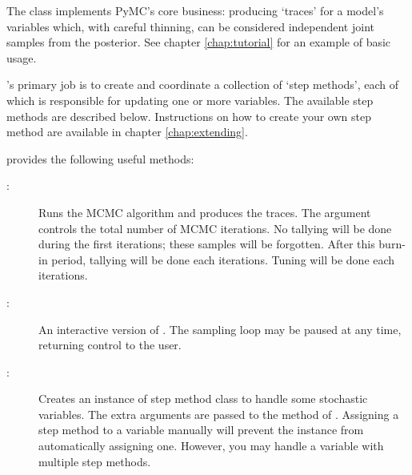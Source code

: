 The  class implements PyMC's core business: producing `traces' for a model's variables which, with careful thinning, can be considered independent joint samples from the posterior. See chapter \ref{chap:tutorial} for an example of basic usage.

's primary job is to create and coordinate a collection of `step methods', each of which is responsible for updating one or more variables. The available step methods are described below. Instructions on how to create your own step method are available in chapter \ref{chap:extending}.  

 provides the following useful methods:  
\begin{description}
    \item[:] Runs the MCMC algorithm and produces the traces. The  argument controls the total number of MCMC iterations. No tallying will be done during the first  iterations; these samples will be forgotten. After this burn-in period, tallying will be done each  iterations. Tuning will be done each  iterations.
    \item[:] An interactive version of . The sampling loop may be paused at any time, returning control to the user.
    \item[:] Creates an instance of step method class  to handle some stochastic variables. The extra arguments are passed to the  method of . Assigning a step method to a variable manually will prevent the  instance from automatically assigning one. However, you may handle a variable with multiple step methods.
    

\end{description}

